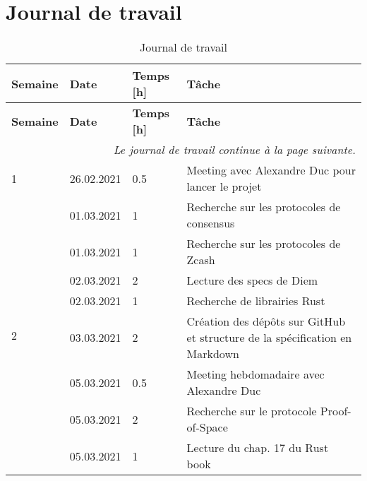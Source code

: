 \chapter{Journal de travail}

\bgroup
\def\arraystretch{1.5}
\begin{longtable}[c]{l l l p{8.2cm}}
    \caption{Journal de travail}\\

    \hline
    \textbf{Semaine} & \textbf{Date} & \textbf{Temps [h]} & \textbf{Tâche}\\
    \hline
    \hline
    \endfirsthead
    
    \hline
    \textbf{Semaine} & \textbf{Date} & \textbf{Temps [h]} & \textbf{Tâche}\\
    \hline
    \hline
    \endhead
    
    \multicolumn{4}{r}{\small \it Le journal de travail continue à la page suivante.} \\
    \normalsize
    \endfoot
    
    \hline
    \endlastfoot
	
	1
	& 26.02.2021
	& 0.5
	& Meeting avec Alexandre Duc pour lancer le projet \\
	
	\hline
	
	\multirow{8}{*}{2}
	& 01.03.2021
	& 1
	& Recherche sur les protocoles de consensus \\
	
	& 01.03.2021
	& 1
	& Recherche sur les protocoles de Zcash \\
	
	& 02.03.2021
	& 2
	& Lecture des specs de Diem \\
	
	& 02.03.2021
	& 1
	& Recherche de librairies Rust \\
	
	& 03.03.2021
	& 2
	& Création des dépôts sur GitHub et structure de la spécification en Markdown \\
	
	& 05.03.2021
	& 0.5
	& Meeting hebdomadaire avec Alexandre Duc \\
	
	& 05.03.2021
	& 2
	& Recherche sur le protocole Proof-of-Space \\
	
	& 05.03.2021
	& 1
	& Lecture du chap. 17 du Rust book \\
	
	\hline
	

\end{longtable}
